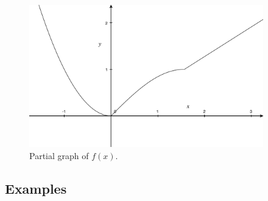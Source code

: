 \documentclass[12pt,addpoints, answers, fleqn]{exam}
\begin{document}
\begin{figure}[htbp] %
   \centering
   \includegraphics[width=4in]{./graphics/graph0401.pdf} 
   \caption{Partial graph of $f\left( x \right)$.}
   \label{fig:graph0401}
\end{figure}



\subsection{Examples}
\end{document}
